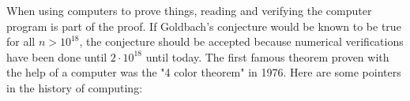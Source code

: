 \documentclass[12pt]{amsart}
\newcounter{example}    \def\example#1{ \item \fontsize{12}{15} \selectfont #1 \fontsize{12}{15} \selectfont }
\begin{document}
When using computers to prove things, reading and verifying the computer program is part of the proof. 
If Goldbach's conjecture would be known to be true for all $n>10^{18}$, the conjecture should be accepted because
numerical verifications have been done until $2 \cdot 10^{18}$ until today.  
The first famous theorem proven with the help of a computer was the "4 color theorem" in 1976. 
Here are some pointers in the history of computing: 
\end{document}
